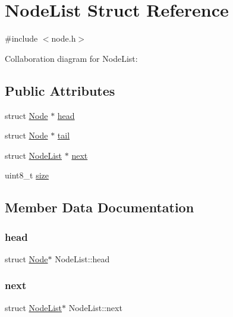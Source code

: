 \hypertarget{structNodeList}{}\section{Node\+List Struct Reference}
\label{structNodeList}


{\ttfamily \#include $<$node.\+h$>$}



Collaboration diagram for Node\+List\+:
\subsection*{Public Attributes}
\begin{DoxyCompactItemize}
\item 
struct \hyperlink{structNode}{Node} $\ast$ \hyperlink{structNodeList_a500c583f3c8549c7d67b5f93e1be3446}{head}
\item 
struct \hyperlink{structNode}{Node} $\ast$ \hyperlink{structNodeList_a5e1aefe538276375a3060f1a0a790ae7}{tail}
\item 
struct \hyperlink{structNodeList}{Node\+List} $\ast$ \hyperlink{structNodeList_aa23958a9a1c5e6809801be177f2f0511}{next}
\item 
uint8\+\_\+t \hyperlink{structNodeList_a95b9e4691065c03c3e6bf81d40c7d57f}{size}
\end{DoxyCompactItemize}


\subsection{Member Data Documentation}
\mbox{\label{structNodeList_a500c583f3c8549c7d67b5f93e1be3446}} 
\subsubsection{\texorpdfstring{head}{head}}
{\footnotesize\ttfamily struct \hyperlink{structNode}{Node}$\ast$ Node\+List\+::head}

\mbox{\label{structNodeList_aa23958a9a1c5e6809801be177f2f0511}} 
\subsubsection{\texorpdfstring{next}{next}}
{\footnotesize\ttfamily struct \hyperlink{structNodeList}{Node\+List}$\ast$ Node\+List\+::next}

